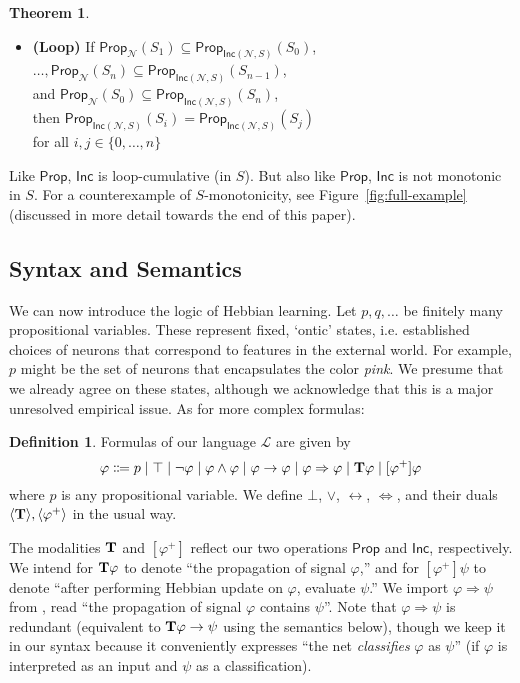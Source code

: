 \documentclass[letterpaper]{article}
\theoremstyle{definition}
\newtheorem{definition}{Definition}
\newtheorem{theorem}{Theorem}
\newcommand{\set}[1]{\{ #1 \}}
\newcommand{\lang}{\mathcal{L}}
\newcommand{\Typ}{\textrm{\textup{\textbf{T}}}}
\newcommand{\Prop}{\textsf{Prop}}
\newcommand{\Inc}{\textsf{Inc}}
\newcommand{\Net}{\mathcal{N}}
\begin{document}
\begin{theorem}
\begin{itemize}
    \item \textbf{(Loop)} If ${\Prop_\Net(S_1) \subseteq \Prop_{\Inc(\Net, S)}(S_0)}$,\\
    $\ldots, {\Prop_\Net(S_n) \subseteq \Prop_{\Inc(\Net, S)}(S_{n-1})}$,\\
    and 
    ${\Prop_\Net(S_0) \subseteq \Prop_{\Inc(\Net, S)}(S_n)}$,\\
    then ${\Prop_{\Inc(\Net, S)}(S_i) = \Prop_{\Inc(\Net, S)}(S_j)}$\\
    for all $i, j \in \set{0, \ldots, n}$
\end{itemize}
\label{thm:inc-props}
\end{theorem}

Like $\Prop$, $\Inc$ is loop-cumulative (in $S$).  But also like $\Prop$, $\Inc$ is not monotonic in $S$.  For a counterexample of $S$-monotonicity, see Figure~\ref{fig:full-example} (discussed in more detail towards the end of this paper).

\subsection{Syntax and Semantics}

We can now introduce the logic of Hebbian learning.  Let $p, q, \ldots$ be finitely many propositional variables.  These represent fixed, `ontic' states, i.e. established choices of neurons that correspond to features in the external world.  For example, $p$ might be the set of neurons that encapsulates the color \emph{pink}.  We presume that we already agree on these states, although we acknowledge that this is a major unresolved empirical issue.  As for more complex formulas:

\begin{definition}  Formulas of our language $\lang$ are given by
\[
\varphi \Coloneqq p \mid \top \mid \neg \varphi \mid \varphi \land \varphi \mid \varphi \to \varphi \mid \varphi \Rightarrow \varphi \mid \Typ \varphi \mid [\varphi^+] \varphi
\]
where $p$ is any propositional variable.  We define $\bot$, $\lor$, $\leftrightarrow$, $\Leftrightarrow$, and their duals $\langle \Typ \rangle, \langle \varphi^+ \rangle$ in the usual way.
\end{definition}

The modalities $\Typ$ and $[\varphi^+]$ reflect our two operations $\Prop$ and $\Inc$, respectively.  We intend for $\Typ \varphi$ to denote ``the propagation of signal $\varphi$,'' and for $[\varphi^+] \psi$ to denote ``after performing Hebbian update on $\varphi$, evaluate $\psi$.''  We import ${\varphi \Rightarrow \psi}$ from \cite{leitgeb2001nonmonotonic}, read ``the propagation of signal $\varphi$ contains $\psi$''.  Note that ${\varphi \Rightarrow \psi}$ is redundant (equivalent to $\Typ \varphi \to \psi$ using the semantics below), though we keep it in our syntax because it conveniently expresses ``the net \emph{classifies} $\varphi$ as $\psi$'' (if $\varphi$ is interpreted as an input and $\psi$ as a classification).
\end{document}

